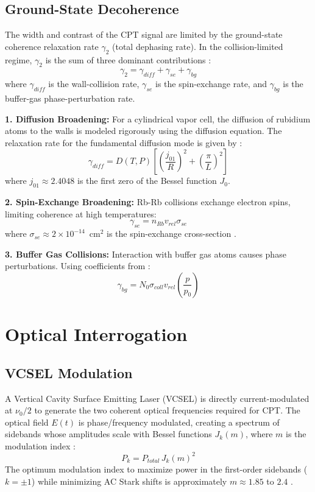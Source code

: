 \documentclass[11pt,a4paper]{article}
\begin{document}
\subsection{Ground-State Decoherence}
The width and contrast of the CPT signal are limited by the ground-state coherence relaxation rate $\gamma_2$ (total dephasing rate). In the collision-limited regime, $\gamma_2$ is the sum of three dominant contributions \cite{Vanier2005, Vanier1989}:
\begin{equation}
    \gamma_2 = \gamma_{diff} + \gamma_{se} + \gamma_{bg}
\end{equation}
where $\gamma_{diff}$ is the wall-collision rate, $\gamma_{se}$ is the spin-exchange rate, and $\gamma_{bg}$ is the buffer-gas phase-perturbation rate.

\textbf{1. Diffusion Broadening:} For a cylindrical vapor cell, the diffusion of rubidium atoms to the walls is modeled rigorously using the diffusion equation. The relaxation rate for the fundamental diffusion mode is given by \cite{Bouchiat1966, Vanier2005, Franz1976}:
\begin{equation}
    \gamma_{diff} = D(T, P) \left[ \left(\frac{j_{01}}{R}\right)^2 + \left(\frac{\pi}{L}\right)^2 \right]
\end{equation}
where $j_{01} \approx 2.4048$ is the first zero of the Bessel function $J_0$.

\textbf{2. Spin-Exchange Broadening:} Rb-Rb collisions exchange electron spins, limiting coherence at high temperatures:
\begin{equation}
    \gamma_{se} = n_{Rb} v_{rel} \sigma_{se}
\end{equation}
where $\sigma_{se} \approx 2 \times 10^{-14}$~cm$^2$ is the spin-exchange cross-section \cite{Vanier2005}.

\textbf{3. Buffer Gas Collisions:} Interaction with buffer gas atoms causes phase perturbations. Using coefficients from \cite{Kozlova2011, Franz1976}:
\begin{equation}
    \gamma_{bg} = N_0 \sigma_{coll} v_{rel} \left( \frac{p}{p_0} \right)
\end{equation}

\section{Optical Interrogation}
\subsection{VCSEL Modulation}
A Vertical Cavity Surface Emitting Laser (VCSEL) is directly current-modulated at $\nu_0/2$ to generate the two coherent optical frequencies required for CPT. The optical field $E(t)$ is phase/frequency modulated, creating a spectrum of sidebands whose amplitudes scale with Bessel functions $J_k(m)$, where $m$ is the modulation index \cite{Shah2010}:
\begin{equation}
    P_k = P_{total} \, J_k(m)^2
\end{equation}
The optimum modulation index to maximize power in the first-order sidebands ($k=\pm 1$) while minimizing AC Stark shifts is approximately $m \approx 1.85$ to $2.4$ \cite{Shah2010}.
\end{document}
